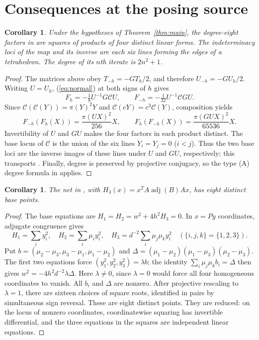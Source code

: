 \documentclass[11pt]{article}
\newtheorem{corollary}[theorem]{Corollary}
\newcommand{\adj}{\operatorname{adj}}
\newcommand{\Cr}{\mathcal C}
\begin{document}
\section{Consequences at the posing source}
\begin{corollary}\label{cor:planes}
Under the hypotheses of Theorem~\ref{thm:main}, the degree-eight factors in
\cite[(7.15)]{GG} are squares of products of four distinct linear forms.
The indeterminacy loci of the map and its inverse are each six lines forming
the edges of a tetrahedron. The degree of its $n$th iterate is $2n^2+1$.
\end{corollary}
\begin{proof}
The matrices above obey $T_{-h}=-GT_h/2$, and therefore $U_{-h}=-GU_h/2$.
Writing $U=U_h$, (\ref{eq:normal}) at both signs of $h$ gives
\[
 F_h=-\tfrac18U^{-1}G\Cr U,\qquad
 F_{-h}=-\tfrac1{32}U^{-1}\Cr G U.
\]
Since $\Cr(\Cr(Y))=\pi(Y)^2Y$ and $\Cr(cY)=c^3\Cr(Y)$, composition yields
\begin{equation}\label{eq:compositions}
 F_{-h}(F_h(X))=\frac{\pi(UX)^2}{256}X,\qquad
 F_h(F_{-h}(X))=\frac{\pi(GUX)^2}{65536}X.
\end{equation}
Invertibility of $U$ and $GU$ makes the four factors in each product distinct.
The base locus of $\Cr$ is the union of the six lines $Y_i=Y_j=0$
($i<j$). Thus the two base loci are the inverse images of these lines under
$U$ and $GU$, respectively; this transports \cite[Remark 2.8]{GG}.
Finally, degree is preserved by projective conjugacy, so the type (A)
degree formula in \cite[Proposition 5.3]{GG} applies.
\end{proof}

\begin{corollary}\label{cor:eight}
The net in \cite[(7.16)]{GG}, with
$H_3(x)=x^TA\adj(B)Ax$, has eight distinct base points.
\end{corollary}
\begin{proof}
The base equations are $H_1=H_2=w^2+4h^2H_3=0$.
In $x=Py$ coordinates, adjugate congruence gives
\[
 H_1=\sum_i y_i^2,\quad H_2=\sum_i\mu_i y_i^2,\quad
 H_3=d^{-2}\sum_i\mu_j\mu_k y_i^2\quad(\{i,j,k\}=\{1,2,3\}).
\]
Put $b=(\mu_2-\mu_3,\mu_3-\mu_1,\mu_1-\mu_2)$ and
$\Delta=(\mu_1-\mu_2)(\mu_1-\mu_3)(\mu_2-\mu_3)$.
The first two equations force $(y_1^2,y_2^2,y_3^2)=\lambda b$; the identity
$\sum_i\mu_j\mu_k b_i=\Delta$ then gives
$w^2=-4h^2d^{-2}\lambda\Delta$.
Here $\lambda\ne0$, since $\lambda=0$ would force all four homogeneous
coordinates to vanish. All $b_i$ and $\Delta$ are nonzero. After projective
rescaling to $\lambda=1$, there are sixteen choices of square roots, identified
in pairs by simultaneous sign reversal. These are eight distinct points.
They are reduced: on the locus of nonzero coordinates, coordinatewise squaring
has invertible differential, and the three equations in the squares are
independent linear equations.
\end{proof}
\end{document}
